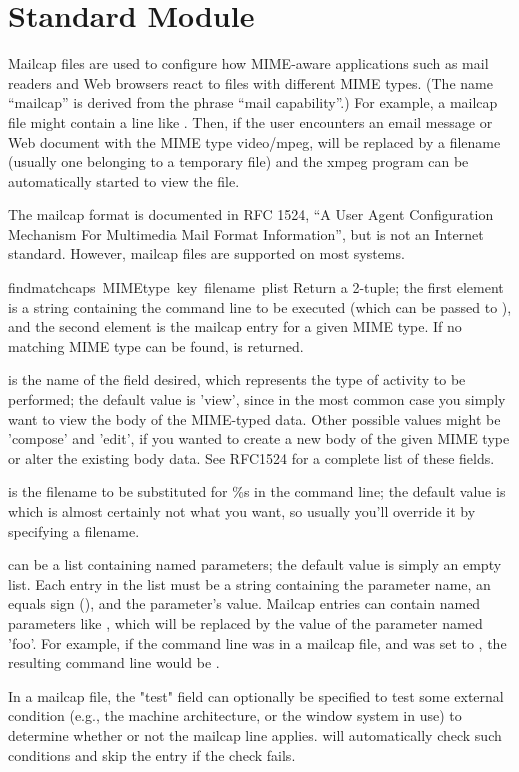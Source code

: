 \section{Standard Module }
\label{module-mailcap}
\renewcommand{\indexsubitem}{(in module mailcap)}

Mailcap files are used to configure how MIME-aware applications such
as mail readers and Web browsers react to files with different MIME
types. (The name ``mailcap'' is derived from the phrase ``mail
capability''.)  For example, a mailcap file might contain a line like
.  Then, if the user encounters an email
message or Web document with the MIME type video/mpeg,  will be
replaced by a filename (usually one belonging to a temporary file) and
the xmpeg program can be automatically started to view the file.

The mailcap format is documented in RFC 1524, ``A User Agent
Configuration Mechanism For Multimedia Mail Format Information'', but
is not an Internet standard.  However, mailcap files are supported on
most \UNIX{} systems.

\begin{funcdesc}{findmatch}{caps\, MIMEtype\, key\, filename\, plist}
Return a 2-tuple; the first element is a string containing the command
line to be executed
(which can be passed to ), and the second element is
the mailcap entry for a given MIME type.  If no matching MIME
type can be found,  is returned.

 is the name of the field desired, which represents the type of
activity to be performed; the default value is 'view', since in the
most common case you simply want to view the body of the MIME-typed
data.  Other possible values might be 'compose' and 'edit', if you
wanted to create a new body of the given MIME type or alter the
existing body data.  See RFC1524 for a complete list of these fields.

 is the filename to be substituted for \%s in the
command line; the default value is
 which is almost certainly not what you want, so
usually you'll override it by specifying a filename.

 can be a list containing named parameters; the default
value is simply an empty list.  Each entry in the list must be a
string containing the parameter name, an equals sign (\code{=}), and the
parameter's value.  Mailcap entries can contain 
named parameters like , which will be replaced by the
value of the parameter named 'foo'.  For example, if the command line
was in a mailcap file, and  was set to \code{['id=1',
'number=2', 'total=3']}, the resulting command line would be 
.  

In a mailcap file, the "test" field can optionally be specified to
test some external condition (e.g., the machine architecture, or the
window system in use) to determine whether or not the mailcap line
applies.   will automatically check such conditions
and skip the entry if the check fails.
\end{funcdesc}

